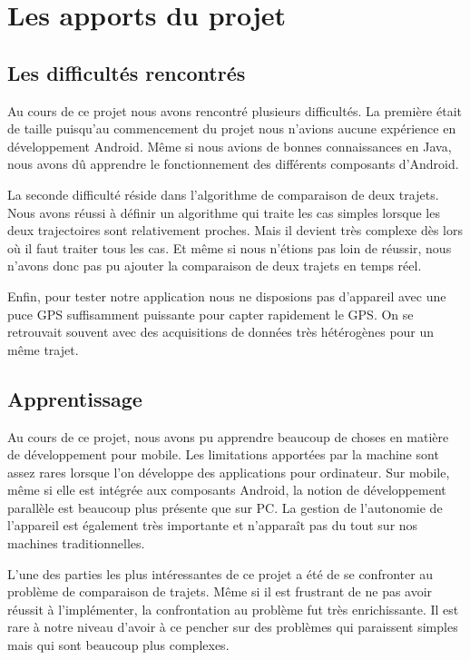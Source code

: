 \chapter{Les apports du projet}
\section{Les difficultés rencontrés}
Au cours de ce projet nous avons rencontré plusieurs difficultés. La première était de taille puisqu'au commencement du projet nous n'avions aucune expérience en développement Android. Même si nous avions de bonnes connaissances en Java, nous avons dû apprendre le fonctionnement des différents composants d'Android.\bigskip

La seconde difficulté réside dans l'algorithme de comparaison de deux trajets. Nous avons réussi à définir un algorithme qui traite les cas simples lorsque les deux trajectoires sont relativement proches. Mais il devient très complexe dès lors où il faut traiter tous les cas. Et même si nous n'étions pas loin de réussir, nous n'avons donc pas pu ajouter la comparaison de deux trajets en temps réel.\bigskip

Enfin, pour tester notre application nous ne disposions pas d'appareil avec une puce GPS suffisamment puissante pour capter rapidement le GPS. On se retrouvait souvent avec des acquisitions de données très hétérogènes pour un même trajet.\bigskip

\section{Apprentissage}
Au cours de ce projet, nous avons pu apprendre beaucoup de choses en matière de développement pour mobile. Les limitations apportées par la machine sont assez rares lorsque l'on développe des applications pour ordinateur. Sur mobile, même si elle est intégrée aux composants Android, la notion de développement parallèle est beaucoup plus présente que sur PC. La gestion de l'autonomie de l'appareil est également très importante et n’apparaît pas du tout sur nos machines traditionnelles.\bigskip

L'une des parties les plus intéressantes de ce projet a été de se confronter au problème de comparaison de trajets. Même si il est frustrant de ne pas avoir réussit à l'implémenter, la confrontation au problème fut très enrichissante. Il est rare à notre niveau d'avoir à ce pencher sur des problèmes qui paraissent simples mais qui sont beaucoup plus complexes.